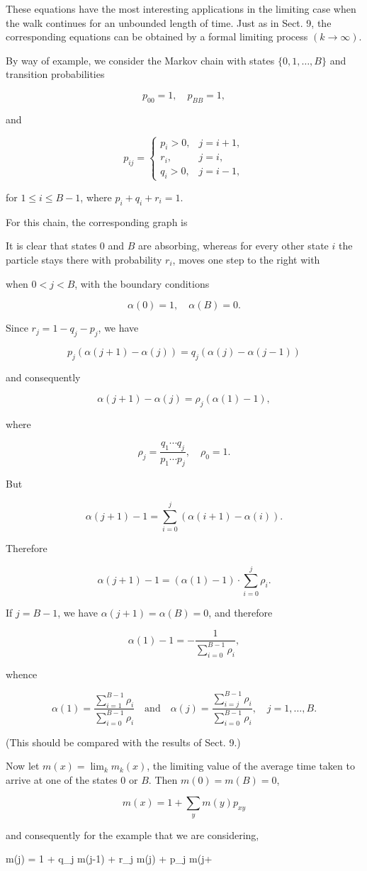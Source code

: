 These equations have the most interesting applications in the limiting case when the walk continues for an unbounded length of time. Just as in Sect. 9, the corresponding equations can be obtained by a formal limiting process $(k \to \infty)$.

By way of example, we consider the Markov chain with states $\{0, 1, \ldots, B\}$ and transition probabilities

$$p_{00} = 1, \quad p_{BB} = 1,$$

and

$$p_{ij} = \begin{cases} p_i > 0, & j = i + 1, \\ r_i, & j = i, \\ q_i > 0, & j = i - 1, \end{cases}$$

for $1 \leq i \leq B - 1$, where $p_i + q_i + r_i = 1$.

For this chain, the corresponding graph is

It is clear that states 0 and $B$ are absorbing, whereas for every other state $i$ the particle stays there with probability $r_i$, moves one step to the right with

when $0 < j < B$, with the boundary conditions

$$\alpha(0) = 1, \quad \alpha(B) = 0.$$

Since $r_j = 1 - q_j - p_j$, we have

$$p_j(\alpha(j+1) - \alpha(j)) = q_j(\alpha(j) - \alpha(j-1))$$

and consequently

$$\alpha(j+1) - \alpha(j) = \rho_j(\alpha(1) - 1),$$

where

$$\rho_j = \frac{q_1 \cdots q_j}{p_1 \cdots p_j}, \quad \rho_0 = 1.$$

But

$$\alpha(j+1) - 1 = \sum_{i=0}^{j} (\alpha(i+1) - \alpha(i)).$$

Therefore

$$\alpha(j+1) - 1 = (\alpha(1) - 1) \cdot \sum_{i=0}^{j} \rho_i.$$

If $j = B-1$, we have $\alpha(j+1) = \alpha(B) = 0$, and therefore

$$\alpha(1) - 1 = -\frac{1}{\sum_{i=0}^{B-1} \rho_i},$$

whence

$$\alpha(1) = \frac{\sum_{i=1}^{B-1} \rho_i}{\sum_{i=0}^{B-1} \rho_i} \quad \text{and} \quad \alpha(j) = \frac{\sum_{i=j}^{B-1} \rho_i}{\sum_{i=0}^{B-1} \rho_i}, \quad j = 1, \ldots, B.$$

(This should be compared with the results of Sect. 9.)

Now let $m(x) = \lim_k m_k(x)$, the limiting value of the average time taken to arrive at one of the states 0 or $B$. Then $m(0) = m(B) = 0$,

$$m(x) = 1 + \sum_y m(y)p_{xy}$$

and consequently for the example that we are considering,

$$m(j) = 1 + q_j m(j-1) + r_j m(j) + p_j m(j+
